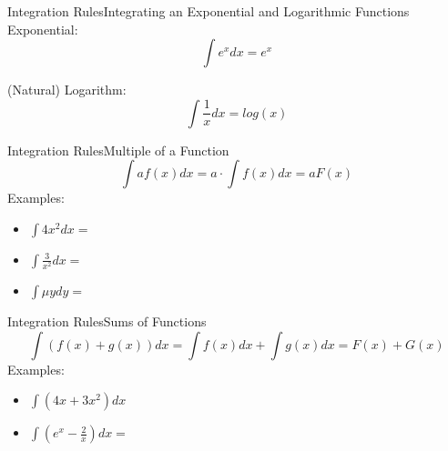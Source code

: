\documentclass{beamer}
\begin{document}
\begin{frame}{Integration Rules}{Integrating an Exponential and Logarithmic Functions}
Exponential:
\[
\int e^x dx=e^x
\]
\vspace{3mm}

(Natural) Logarithm:
\[
\int \frac{1}{x} dx=log(x)
\]


\end{frame}





\begin{frame}{Integration Rules}{Multiple of a Function}
\[
\int af(x)dx=a\cdot \int f(x)dx=aF(x)
\] %
Examples:
\begin{itemize}
\item $\int 4x^2dx= $%
\vspace{2mm}
\item $\int \frac{3}{x^2}dx=$%
\vspace{2mm}
\item $\int \mu ydy= $%
\end{itemize}
\end{frame}


\begin{frame}{Integration Rules}{Sums of Functions}
\[
\int \left(f(x)+g(x) \right)dx=\int f(x)dx+\int g(x)dx=F(x)+G(x)
\] %
Examples:
\begin{itemize}
\item $\int \left(4x+3x^2\right)dx$%
\vspace{10mm}
\item $\int \left(e^x-\frac{2}{x}\right)dx=$%
\end{itemize}
\end{frame}
\end{document}
